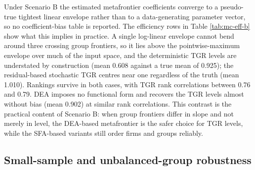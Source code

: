 \begin{table}
\centering
\caption{\label{tab:mc-eff-b}Efficiency recovery under Scenario B: three groups with group-specific slopes, correlated log inputs, and group-specific input means (means over successful replications). The true TGR is computed against the pointwise maximum over the group frontiers; column definitions follow the Scenario A table.}
\centering
{}
\end{table}

Under Scenario B the estimated metafrontier coefficients converge to a
pseudo-true tightest linear envelope rather than to a data-generating
parameter vector, so no coefficient-bias table is reported. The efficiency
rows in Table \ref{tab:mc-eff-b} show what this implies in practice. A
single log-linear envelope cannot bend around three crossing group
frontiers, so it lies above the pointwise-maximum envelope over much of
the input space, and the deterministic TGR levels are understated by
construction (mean 0.608 against a true mean of 0.925); the residual-based
stochastic TGR centres near one regardless of the truth (mean 1.010).
Rankings survive in both cases, with TGR rank correlations between 0.76
and 0.79. DEA imposes no functional form and recovers the TGR levels
almost without bias (mean 0.902) at similar rank correlations. This
contrast is the practical content of Scenario B: when group frontiers
differ in slope and not merely in level, the DEA-based metafrontier is the
safer choice for TGR levels, while the SFA-based variants still order
firms and groups reliably.

\subsection{Small-sample and unbalanced-group robustness}\label{sec:robustness}

